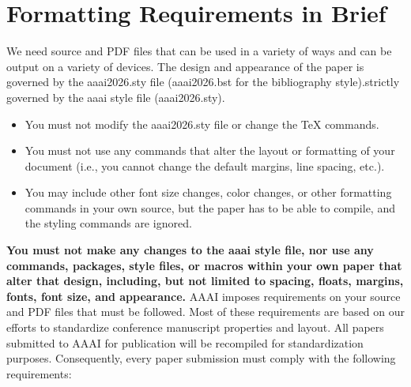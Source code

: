 \documentclass[letterpaper]{article} %
\begin{document}
\section{Formatting Requirements in Brief}
We need source and PDF files that can be used in a variety of ways and can be output on a variety of devices. The design and appearance of the paper is \ifdefined\aaaianonymous governed by the aaai2026.sty file (aaai2026.bst for the bibliography style).\else strictly governed by the aaai style file (aaai2026.sty).\fi
\ifdefined\aaaianonymous
\begin{itemize}
\item You must not modify the aaai2026.sty file or change the TeX commands.
\item You must not use any commands that alter the layout or formatting of your document (i.e., you cannot change the default margins, line spacing, etc.).
\item You may include other font size changes, color changes, or other formatting commands in your own source, but the paper has to be able to compile, and the styling commands are ignored.
\end{itemize}
\else
\textbf{You must not make any changes to the aaai style file, nor use any commands, packages, style files, or macros within your own paper that alter that design, including, but not limited to spacing, floats, margins, fonts, font size, and appearance.} AAAI imposes requirements on your source and PDF files that must be followed. Most of these requirements are based on our efforts to standardize conference manuscript properties and layout. All papers submitted to AAAI for publication will be recompiled for standardization purposes. Consequently, every paper submission must comply with the following requirements:
\end{document}
